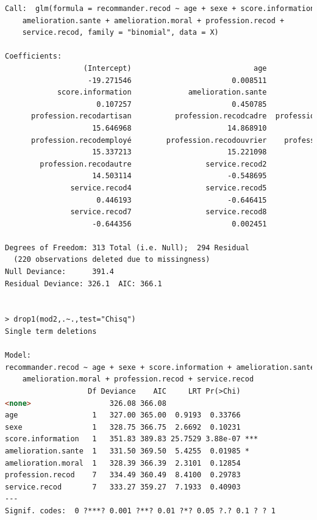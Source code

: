 \begin{lstlisting}[language=html]
Call:  glm(formula = recommander.recod ~ age + sexe + score.information + 
    amelioration.sante + amelioration.moral + profession.recod + 
    service.recod, family = "binomial", data = X)

Coefficients:
                  (Intercept)                            age                           sexe  
                   -19.271546                       0.008511                       0.513048  
            score.information             amelioration.sante             amelioration.moral  
                     0.107257                       0.450785                       0.248822  
      profession.recodartisan          profession.recodcadre  profession.recodintermédiaire  
                    15.646968                      14.868910                      14.569908  
      profession.recodemployé        profession.recodouvrier    profession.recodsans emploi  
                    15.337213                      15.221098                      14.499228  
        profession.recodautre                 service.recod2                 service.recod3  
                    14.503114                      -0.548695                      -0.581140  
               service.recod4                 service.recod5                 service.recod6  
                     0.446193                      -0.646415                      -0.221565  
               service.recod7                 service.recod8  
                    -0.644356                       0.002451  

Degrees of Freedom: 313 Total (i.e. Null);  294 Residual
  (220 observations deleted due to missingness)
Null Deviance:      391.4 
Residual Deviance: 326.1  AIC: 366.1


> drop1(mod2,.~.,test="Chisq")
Single term deletions

Model:
recommander.recod ~ age + sexe + score.information + amelioration.sante + 
    amelioration.moral + profession.recod + service.recod
                   Df Deviance    AIC     LRT Pr(>Chi)    
<none>                  326.08 366.08                     
age                 1   327.00 365.00  0.9193  0.33766    
sexe                1   328.75 366.75  2.6692  0.10231    
score.information   1   351.83 389.83 25.7529 3.88e-07 ***
amelioration.sante  1   331.50 369.50  5.4255  0.01985 *  
amelioration.moral  1   328.39 366.39  2.3101  0.12854    
profession.recod    7   334.49 360.49  8.4100  0.29783    
service.recod       7   333.27 359.27  7.1933  0.40903    
---
Signif. codes:  0 ?***? 0.001 ?**? 0.01 ?*? 0.05 ?.? 0.1 ? ? 1



\end{lstlisting}

